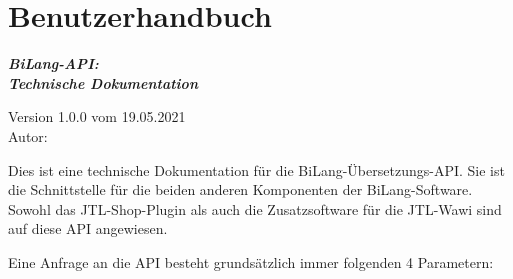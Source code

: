 \section{Benutzerhandbuch}
\label{sec:api_documentation}
\vspace*{36 pt}
\vspace{4cm}
\begin{center}\Huge\bfseries\itshape
BiLang-API: \\
Technische Dokumentation
\end{center}	

\vspace{11cm}
\begin{center}\large
	Version 1.0.0 vom 19.05.2021 \\
	Autor: \companyName
\end{center}
\newpage


Dies ist eine technische Dokumentation für die BiLang-Übersetzungs-API. 
Sie ist die Schnittstelle für die beiden anderen Komponenten der BiLang-Software. 
Sowohl das JTL-Shop-Plugin als auch die Zusatzsoftware für die JTL-Wawi sind auf diese API angewiesen. 

Eine Anfrage an die API besteht grundsätzlich immer folgenden 4 Parametern:

